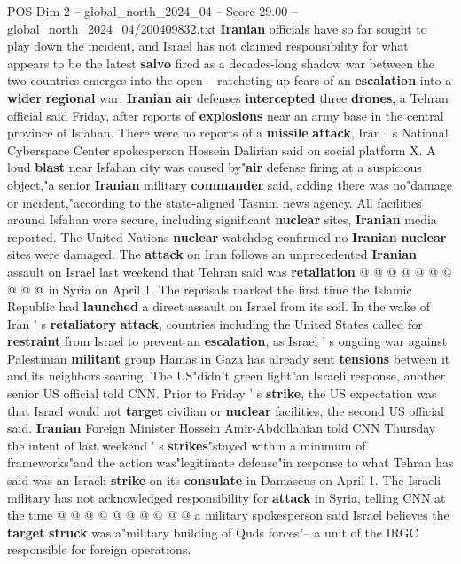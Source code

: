 \begin{textsample}{POS Dim 2 – global\_north\_2024\_04 – Score 29.00 – global\_north\_2024\_04/200409832.txt}  \label{ex:f2_pos_165}
\textbf{Iranian} officials have so far sought to play down the incident, and Israel has not claimed responsibility for what appears to be the latest \textbf{salvo} fired as a decades-long shadow war between the two countries emerges into the open -- ratcheting up fears of an \textbf{escalation} into a \textbf{wider} \textbf{regional} war. \textbf{Iranian} \textbf{air} defenses \textbf{intercepted} three \textbf{drones}, a Tehran official said Friday, after reports of \textbf{explosions} near an army base in the central province of Isfahan.
There were no reports of a \textbf{missile} \textbf{attack}, Iran ' s National Cyberspace Center spokesperson Hossein Dalirian said on social platform X.
A loud \textbf{blast} near Isfahan city was caused by"\textbf{air} defense firing at a suspicious object,"a senior \textbf{Iranian} military \textbf{commander} said, adding there was no"damage or incident,"according to the state-aligned Tasnim news agency.
All facilities around Isfahan were secure, including significant \textbf{nuclear} sites, \textbf{Iranian} media reported.
The United Nations \textbf{nuclear} watchdog confirmed no \textbf{Iranian} \textbf{nuclear} sites were damaged.
The \textbf{attack} on Iran follows an unprecedented \textbf{Iranian} assault on Israel last weekend that Tehran said was \textbf{retaliation} @ @ @ @ @ @ @ @ @ @ in Syria on April 1.
The reprisals marked the first time the Islamic Republic had \textbf{launched} a direct assault on Israel from its soil.
In the wake of Iran ' s \textbf{retaliatory} \textbf{attack}, countries including the United States called for \textbf{restraint} from Israel to prevent an \textbf{escalation}, as Israel ' s ongoing war against Palestinian \textbf{militant} group Hamas in Gaza has already sent \textbf{tensions} between it and its neighbors soaring.
The US"didn't green light"an Israeli response, another senior US official told CNN.
Prior to Friday ' s \textbf{strike}, the US expectation was that Israel would not \textbf{target} civilian or \textbf{nuclear} facilities, the second US official said. \textbf{Iranian} Foreign Minister Hossein Amir-Abdollahian told CNN Thursday the intent of last weekend ' s \textbf{strikes}"stayed within a minimum of frameworks"and the action was"legitimate defense"in response to what Tehran has said was an Israeli \textbf{strike} on its \textbf{consulate} in Damascus on April 1.
The Israeli military has not acknowledged responsibility for \textbf{attack} in Syria, telling CNN at the time @ @ @ @ @ @ @ @ @ @ a military spokesperson said Israel believes the \textbf{target} \textbf{struck} was a"military building of Quds forces"-- a unit of the IRGC responsible for foreign operations.

\end{textsample}
